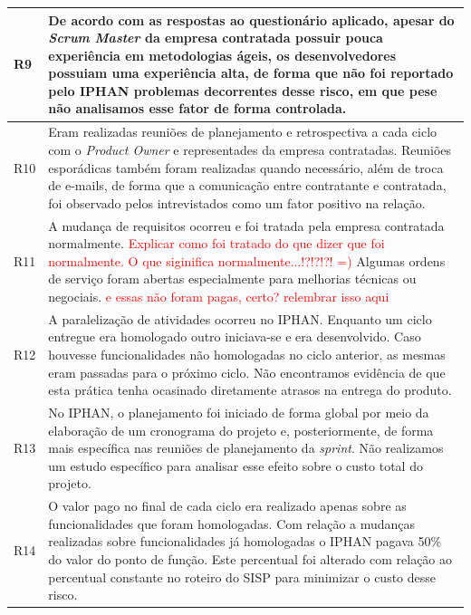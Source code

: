 \begin{longtable}{|p{2cm}|p{13cm}|}
R9                                                                & De acordo com as respostas ao questionário aplicado, apesar do \textit{Scrum Master} da empresa contratada possuir pouca experiência em metodologias ágeis, os desenvolvedores possuiam uma experiência alta, de forma que não foi reportado pelo IPHAN problemas decorrentes desse risco, em que pese não analisamos esse fator de forma controlada.              \\ \hline
R10                                                               &  Eram realizadas reuniões de planejamento e retrospectiva a cada ciclo com o \textit{Product Owner} e representades da empresa contratadas. Reuniões esporádicas também foram realizadas quando necessário, além de troca de e-mails, de forma que a comunicação entre contratante e contratada, foi observado pelos intrevistados como um fator positivo na relação.                \\ \hline
R11                                                               & A mudança de requisitos ocorreu e foi tratada pela empresa contratada normalmente. \textcolor{red}{Explicar como foi tratado do que dizer que foi normalmente. O que siginifica normalmente...!?!?!?! =) } Algumas ordens de serviço foram abertas especialmente para melhorias técnicas ou negociais. \textcolor{red}{e essas não foram pagas, certo? relembrar isso aqui}             \\ \hline
R12                                                               & A paralelização de atividades ocorreu no IPHAN. Enquanto um ciclo entregue era homologado outro iniciava-se e era desenvolvido. Caso houvesse funcionalidades não homologadas no ciclo anterior, as mesmas eram passadas para o próximo ciclo. Não encontramos evidência de que esta prática tenha ocasinado diretamente atrasos na entrega do produto.             \\ \hline
R13                                                               & No IPHAN, o planejamento foi iniciado de forma global por meio da elaboração de um cronograma do projeto e, posteriormente, de forma mais específica nas reuniões de planejamento da \textit{sprint}. Não realizamos um estudo específico para analisar esse efeito sobre o custo total do projeto.             \\ \hline
R14                                                               & O valor pago no final de cada ciclo era realizado apenas sobre as funcionalidades que foram homologadas. Com relação a mudanças realizadas sobre funcionalidades já homologadas o IPHAN pagava 50\% do valor do ponto de função. Este percentual foi alterado com relação ao percentual constante no roteiro do SISP para minimizar o custo desse risco.           \\ \hline

\end{longtable}
